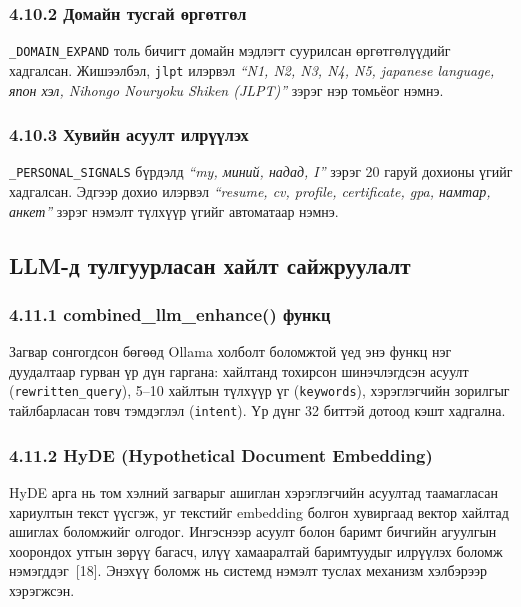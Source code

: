 \documentclass[11pt,a4paper]{article}
\begin{document}
\subsubsection*{4.10.2 Домайн тусгай өргөтгөл}

\texttt{\_DOMAIN\_EXPAND} толь бичигт домайн мэдлэгт суурилсан өргөтгөлүүдийг хадгалсан. Жишээлбэл, \texttt{jlpt} илэрвэл \textit{``N1, N2, N3, N4, N5, japanese language, япон хэл, Nihongo Nouryoku Shiken (JLPT)''} зэрэг нэр томьёог нэмнэ.

\subsubsection*{4.10.3 Хувийн асуулт илрүүлэх}

\texttt{\_PERSONAL\_SIGNALS} бүрдэлд \textit{``my, миний, надад, I''} зэрэг 20 гаруй дохионы үгийг хадгалсан. Эдгээр дохио илэрвэл \textit{``resume, cv, profile, certificate, gpa, намтар, анкет''} зэрэг нэмэлт түлхүүр үгийг автоматаар нэмнэ.

\subsection{LLM-д тулгуурласан хайлт сайжруулалт}

\subsubsection*{4.11.1 combined\_llm\_enhance() функц}

Загвар сонгогдсон бөгөөд Ollama холболт боломжтой үед энэ функц нэг дуудалтаар гурван үр дүн гаргана: хайлтанд тохирсон шинэчлэгдсэн асуулт (\texttt{rewritten\_query}), 5--10 хайлтын түлхүүр үг (\texttt{keywords}), хэрэглэгчийн зорилгыг тайлбарласан товч тэмдэглэл (\texttt{intent}). Үр дүнг 32 биттэй дотоод кэшт хадгална.

\subsubsection*{4.11.2 HyDE (Hypothetical Document Embedding)}

HyDE арга нь том хэлний загварыг ашиглан хэрэглэгчийн асуултад таамагласан хариултын текст үүсгэж, уг текстийг embedding болгон хувиргаад вектор хайлтад ашиглах боломжийг олгодог. Ингэснээр асуулт болон баримт бичгийн агуулгын хоорондох утгын зөрүү багасч, илүү хамааралтай баримтуудыг илрүүлэх боломж нэмэгддэг~[18]. Энэхүү боломж нь системд нэмэлт туслах механизм хэлбэрээр хэрэгжсэн.
\end{document}
